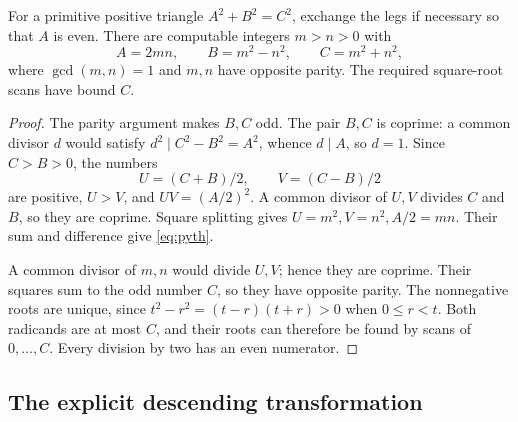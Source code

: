 \begin{lemma}\label{lem:pyth}
For a primitive positive triangle $A^2+B^2=C^2$, exchange the legs
if necessary so that $A$ is even. There are computable integers $m>n>0$
with
\[
 A=2mn,\qquad B=m^2-n^2,\qquad C=m^2+n^2,
 \tag{6.2}\label{eq:pyth}
\]
where $\gcd(m,n)=1$ and $m,n$ have opposite parity.
The required square-root scans have bound $C$.
\end{lemma}
\begin{proof}
The parity argument makes $B,C$ odd. The pair $B,C$ is coprime:
a common divisor $d$ would satisfy $d^2\mid C^2-B^2=A^2$,
whence $d\mid A$, so $d=1$. Since $C>B>0$, the numbers
\[
              U=(C+B)/2,\qquad V=(C-B)/2
\]
are positive, $U>V$, and $UV=(A/2)^2$.
A common divisor of $U,V$ divides $C$ and $B$, so they are coprime.
Square splitting gives $U=m^2,V=n^2,A/2=mn$.
Their sum and difference give \eqref{eq:pyth}.

A common divisor of $m,n$ would divide $U,V$; hence they are coprime.
Their squares sum to the odd number $C$, so they have opposite parity.
The nonnegative roots are unique, since
$t^2-r^2=(t-r)(t+r)>0$ when $0\le r<t$.
Both radicands are at most $C$, and their roots can therefore be found
by scans of $0,\ldots,C$. Every division by two has an even numerator.
\end{proof}

\subsection{The explicit descending transformation}

